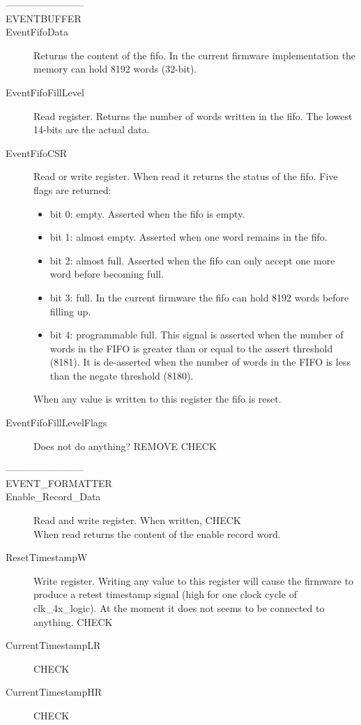 \begin{description}
  \item[------------------------]
  \item[EVENTBUFFER]
  \item[EventFifoData]      Returns the content of the \gls{fifo}. In the current firmware implementation the memory can hold 8192 words (32-bit).
  \item[EventFifoFillLevel] Read register. Returns the number of words written in the \gls{fifo}. The lowest 14-bits are the actual data.
  \item[EventFifoCSR]       Read or write register. When read it returns the status of the \gls{fifo}. Five flags are returned:
                              \begin{itemize}
                                \item bit 0: empty. Asserted when the \gls{fifo} is empty.
                                \item bit 1: almost empty. Asserted when one word remains in the \gls{fifo}.
                                \item bit 2: almost full. Asserted when the \gls{fifo} can only accept one more word before becoming full.
                                \item bit 3: full. In the current firmware the \gls{fifo} can hold 8192 words before filling up.
                                \item bit 4: programmable full. This signal is asserted when the number of words in the FIFO is greater than or equal to the assert threshold (8181). It is de-asserted when the number of words in the FIFO is less than the negate threshold (8180).
                              \end{itemize}
                                When any value is written to this register the \gls{fifo} is reset.
  \item[EventFifoFillLevelFlags] Does not do anything? REMOVE \textcolor[rgb]{1.00,0.00,0.00}{CHECK}
\end{description}

\begin{description}
  \item[------------------------]
  \item[EVENT\_FORMATTER]
  \item[Enable\_Record\_Data] Read and write register. When written, \textcolor[rgb]{1.00,0.00,0.00}{CHECK}\\
                                When read returns the content of the enable record word.
  \item[ResetTimestampW]        Write register. Writing any value to this register will cause the firmware to produce a retest timestamp signal (high for one clock cycle of clk\_4x\_logic). At the moment it does not seems to be connected to anything. \textcolor[rgb]{1.00,0.00,0.00}{CHECK}
  \item[CurrentTimestampLR] \textcolor[rgb]{1.00,0.00,0.00}{CHECK}
  \item[CurrentTimestampHR] \textcolor[rgb]{1.00,0.00,0.00}{CHECK}
\end{description}

